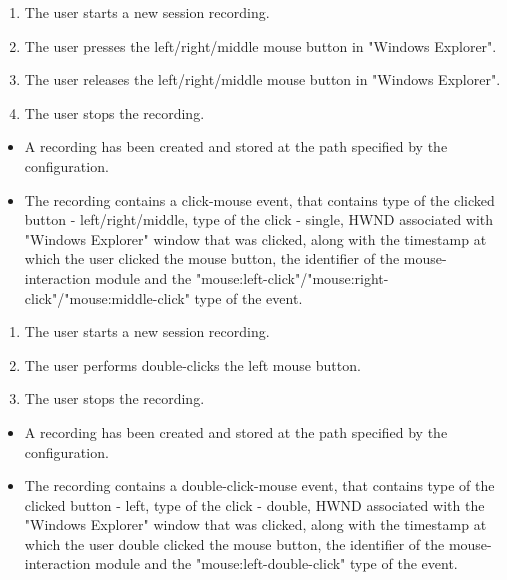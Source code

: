 \begin{tests}
	{\begin{enumerate}
		\item The \gls{user} starts a new session recording.
		\item The \gls{user} presses the left/right/middle mouse button in "Windows Explorer".
		\item The \gls{user} releases the left/right/middle mouse button in "Windows Explorer".
		\item The \gls{user} stops the recording.
	\end{enumerate}}
	{\begin{itemize}
		\item A recording has been created and stored at the path specified by the configuration.
		\item The recording contains a click-mouse event, that contains type of the clicked button - left/right/middle, type of the click - single, HWND associated with "Windows Explorer" window that was clicked, along with the timestamp at which the user clicked the mouse button, the identifier of the mouse-interaction module and the "mouse:left-click"/"mouse:right-click"/"mouse:middle-click" type of the event.
	\end{itemize}}
	
	{\begin{enumerate}
		\item The \gls{user} starts a new session recording.
		\item The \gls{user} performs double-clicks the left mouse button.
		\item The \gls{user} stops the recording.
	\end{enumerate}}
	{\begin{itemize}
		\item A recording has been created and stored at the path specified by the configuration.
		\item The recording contains a double-click-mouse event, that contains type of the clicked button - left, type of the click - double, HWND associated with the "Windows Explorer" window that was clicked, along with the timestamp at which the user double clicked the mouse button, the identifier of the mouse-interaction module and the "mouse:left-double-click" type of the event.
	\end{itemize}}
	

\end{tests}
